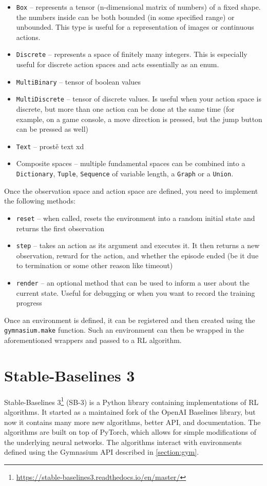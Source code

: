 \documentclass[
  digital,     %
  oneside,     %
  nosansbold,  %
  nocolorbold, %
  lof,         %
  lot,         %
]{fithesis4}
\begin{document}
\begin{itemize}
    \item \verb|Box| -- represents a tensor (n-dimensional matrix of numbers) of a fixed shape. the numbers inside can be both bounded (in some specified range) or unbounded. This type is useful for a representation of images or continuous actions.
    \item \verb|Discrete| -- represents a space of finitely many integers. This is especially useful for discrete action spaces and acts essentially as an enum.
    \item \verb|MultiBinary| -- tensor of boolean values
    \item \verb|MultiDiscrete| -- tensor of discrete values. Is useful when your action space is discrete, but more than one action can be done at the same time (for example, on a game console, a move direction is pressed, but the jump button can be pressed as well)
    \item \verb|Text| -- prostě text xd
    \item Composite spaces -- multiple fundamental spaces can be combined into a \verb|Dictionary|, \verb|Tuple|, \verb|Sequence| of variable length, a \verb|Graph| or a \verb|Union|.
\end{itemize}

Once the observation space and action space are defined, you need to implement the following methods:

\begin{itemize}
    \item \verb|reset| -- when called, resets the environment into a random initial state and returns the first observation
    \item \verb|step| -- takes an action as its argument and executes it. It then returns a new observation, reward for the action, and whether the episode ended (be it due to termination or some other reason like timeout)
    \item \verb|render| -- an optional method that can be used to inform a user about the current state. Useful for debugging or when you want to record the training progress
\end{itemize}

Once an environment is defined, it can be registered and then created using the \verb|gymnasium.make| function. Such an environment can then be wrapped in the aforementioned wrappers and passed to a RL algorithm.

\section{Stable-Baselines 3}
Stable-Baselines 3\footnote{\url{https://stable-baselines3.readthedocs.io/en/master/}} (SB-3) is a Python library containing implementations of RL algorithms. It started as a maintained fork of the OpenAI Baselines library, but now it contains many more new algorithms, better API, and documentation. The algorithms are built on top of PyTorch, which allows for simple modifications of the underlying neural networks. The algorithms interact with environments defined using the Gymnasium API described in \autoref{section:gym}.
\end{document}
